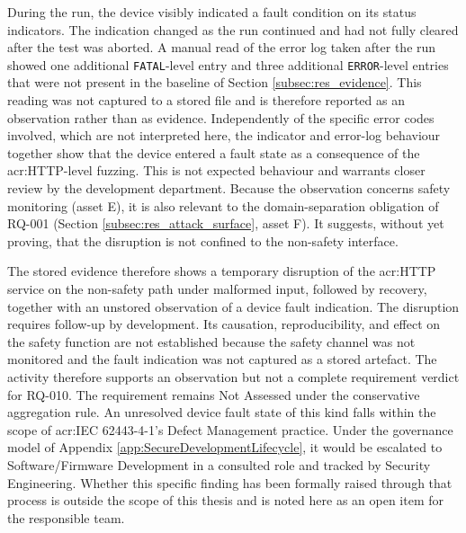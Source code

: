 During the run, the device visibly indicated a fault condition on its status indicators. The indication changed as the run continued and had not fully cleared after the test was aborted. A manual read of the error log taken after the run showed one additional \texttt{FATAL}-level entry and three additional \texttt{ERROR}-level entries that were not present in the baseline of Section \ref{subsec:res_evidence}. This reading was not captured to a stored file and is therefore reported as an observation rather than as evidence.
Independently of the specific error codes involved, which are not interpreted here, the indicator and error-log behaviour together show that the device entered a fault state as a consequence of the \gls{acr:HTTP}-level fuzzing. This is not expected behaviour and warrants closer review by the development department. Because the observation concerns safety monitoring (asset E), it is also relevant to the domain-separation obligation of RQ-001 (Section \ref{subsec:res_attack_surface}, asset F). It suggests, without yet proving, that the disruption is not confined to the non-safety interface.

The stored evidence therefore shows a temporary disruption of the \gls{acr:HTTP} service on the non-safety path under malformed input, followed by recovery, together with an unstored observation of a device fault indication. The disruption requires follow-up by development. Its causation, reproducibility, and effect on the safety function are not established because the safety channel was not monitored and the fault indication was not captured as a stored artefact. The activity therefore supports an observation but not a complete requirement verdict for RQ-010. The requirement remains Not Assessed under the conservative aggregation rule. An unresolved device fault state of this kind falls within the scope of \gls{acr:IEC} 62443-4-1's Defect Management practice. Under the governance model of Appendix \ref{app:SecureDevelopmentLifecycle}, it would be escalated to Software/Firmware Development in a consulted role and tracked by Security Engineering. Whether this specific finding has been formally raised through that process is outside the scope of this thesis and is noted here as an open item for the responsible team.



